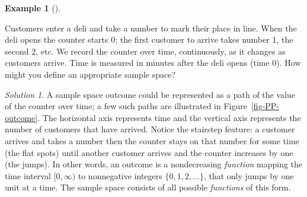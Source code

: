 \documentclass[
  letterpaper,
  DIV=11,
  numbers=noendperiod]{scrreprt}
\theoremstyle{plain}
\theoremstyle{definition}
\newtheorem{example}{Example}[chapter]
\theoremstyle{definition}
\theoremstyle{definition}
\theoremstyle{remark}
\newtheorem{refsolution}{Solution}[chapter]
\begin{document}
\begin{tcolorbox}[enhanced jigsaw, opacityback=0, left=2mm, colframe=quarto-callout-note-color-frame, toprule=.15mm, breakable, colback=white, leftrule=.75mm, arc=.35mm, rightrule=.15mm, bottomrule=.15mm]

\begin{example}[]\protect\hypertarget{exm-PP-outcome}{}\label{exm-PP-outcome}

Customers enter a deli and take a number to mark their place in line.
When the deli opens the counter starts 0; the first customer to arrive
takes number 1, the second 2, etc. We record the counter over time,
continuously, as it changes as customers arrive. Time is measured in
minutes after the deli opens (time 0). How might you define an
appropriate sample space?

\end{example}

\end{tcolorbox}

\begin{tcolorbox}[enhanced jigsaw, opacityback=0, rightrule=.15mm, coltitle=black, colframe=quarto-callout-tip-color-frame, toprule=.15mm, colbacktitle=quarto-callout-tip-color!10!white, opacitybacktitle=0.6, left=2mm, toptitle=1mm, breakable, title={Solution (click to expand)}, bottomtitle=1mm, colback=white, leftrule=.75mm, titlerule=0mm, arc=.35mm, bottomrule=.15mm]

\begin{refsolution}
A sample space outcome could be represented as a path of the value of
the counter over time; a few such paths are illustrated in
Figure~\ref{fig-PP-outcome}. The horizontal axis represents time and the
vertical axis represents the number of customers that have arrived.
Notice the stairstep feature: a customer arrives and takes a number then
the counter stays on that number for some time (the flat spots) until
another customer arrives and the counter increases by one (the jumps).
In other words, an outcome is a nondecreasing \emph{function} mapping
the time interval \([0, \infty)\) to nonnegative integers
\(\{0, 1, 2, \ldots\}\), that only jumps by one unit at a time. The
sample space consists of all possible \emph{functions} of this form.

\label{sol-PP-outcome}

\end{refsolution}

\end{tcolorbox}
\end{document}
